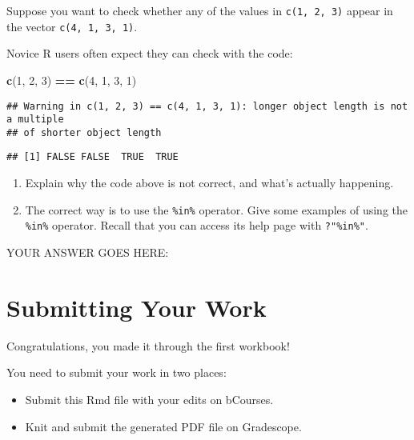 \documentclass[
]{article}
\newenvironment{Shaded}{\begin{snugshade}}{\end{snugshade}}
\newcommand{\DecValTok}[1]{\textcolor[rgb]{0.00,0.00,0.81}{#1}}
\newcommand{\KeywordTok}[1]{\textcolor[rgb]{0.13,0.29,0.53}{\textbf{#1}}}
\newcommand{\NormalTok}[1]{#1}
\newcommand{\OperatorTok}[1]{\textcolor[rgb]{0.81,0.36,0.00}{\textbf{#1}}}
\newcommand{\StringTok}[1]{\textcolor[rgb]{0.31,0.60,0.02}{#1}}
\providecommand{\tightlist}{%
  \setlength{\itemsep}{0pt}\setlength{\parskip}{0pt}}
\begin{document}
Suppose you want to check whether any of the values in
\texttt{c(1,\ 2,\ 3)} appear in the vector \texttt{c(4,\ 1,\ 3,\ 1)}.

Novice R users often expect they can check with the code:

\begin{Shaded}
\begin{Highlighting}[]
\KeywordTok{c}\NormalTok{(}\DecValTok{1}\NormalTok{, }\DecValTok{2}\NormalTok{, }\DecValTok{3}\NormalTok{) }\OperatorTok{==}\StringTok{ }\KeywordTok{c}\NormalTok{(}\DecValTok{4}\NormalTok{, }\DecValTok{1}\NormalTok{, }\DecValTok{3}\NormalTok{, }\DecValTok{1}\NormalTok{)}
\end{Highlighting}
\end{Shaded}

\begin{verbatim}
## Warning in c(1, 2, 3) == c(4, 1, 3, 1): longer object length is not a multiple
## of shorter object length
\end{verbatim}

\begin{verbatim}
## [1] FALSE FALSE  TRUE  TRUE
\end{verbatim}

\begin{enumerate}
\def\labelenumi{\arabic{enumi}.}
\item
  Explain why the code above is not correct, and what's actually
  happening.
\item
  The correct way is to use the \texttt{\%in\%} operator. Give some
  examples of using the \texttt{\%in\%} operator. Recall that you can
  access its help page with \texttt{?"\%in\%"}.
\end{enumerate}

YOUR ANSWER GOES HERE:

\hypertarget{submitting-your-work}{%
\section{Submitting Your Work}\label{submitting-your-work}}

Congratulations, you made it through the first workbook!

You need to submit your work in two places:

\begin{itemize}
\tightlist
\item
  Submit this Rmd file with your edits on bCourses.
\item
  Knit and submit the generated PDF file on Gradescope.
\end{itemize}
\end{document}
